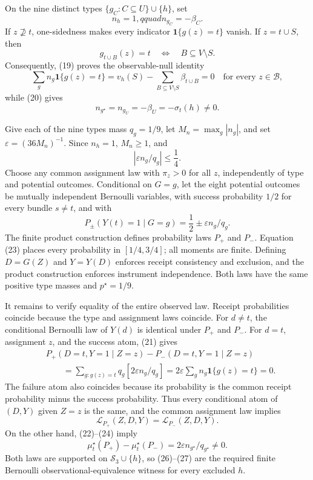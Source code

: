 On the nine distinct types \(\{g_C:C\subseteq U\}\cup\{h\}\), set
\[
n_h=1,qquad n_{g_C}=-\beta_C.
\]
If \(z\not\supseteq t\), one-sidedness makes every indicator \(\mathbf 1\{g(z)=t\}\) vanish.  If \(z=t\cup S\), then
\[
g_{t\cup B}(z)=t
\quad\Longleftrightarrow\quad B\subseteq V\setminus S.
\]
Consequently, (19) proves the observable-null identity
\[
\sum_g n_g\mathbf 1\{g(z)=t\}
=v_h(S)-\sum_{B\subseteq V\setminus S}\beta_{t\cup B}=0
\quad\text{for every }z\in\mathcal B, \tag{21}
\]
while (20) gives
\[
n_{g^\star}=n_{g_U}=-\beta_U=-\sigma_t(h)\ne0. \tag{22}
\]

Give each of the nine types mass \(q_g=1/9\), let \(M_n=\max_g|n_g|\), and set \(\varepsilon=(36M_n)^{-1}\).  Since \(n_h=1\), \(M_n\ge1\), and
\[
\left|\varepsilon n_g/q_g\right|\le\frac14. \tag{23}
\]
Choose any common assignment law with \(\pi_z>0\) for all \(z\), independently of type and potential outcomes.  Conditional on \(G=g\), let the eight potential outcomes be mutually independent Bernoulli variables, with success probability \(1/2\) for every bundle \(s\ne t\), and with
\[
P_\pm(Y(t)=1\mid G=g)=\frac12\pm\varepsilon n_g/q_g. \tag{24}
\]
The finite product construction defines probability laws \(P_+\) and \(P_-\).  Equation (23) places every probability in \([1/4,3/4]\); all moments are finite.  Defining \(D=G(Z)\) and \(Y=Y(D)\) enforces receipt consistency and exclusion, and the product construction enforces instrument independence.  Both laws have the same positive type masses and \(p^\star=1/9\).

It remains to verify equality of the entire observed law.  Receipt probabilities coincide because the type and assignment laws coincide.  For \(d\ne t\), the conditional Bernoulli law of \(Y(d)\) is identical under \(P_+\) and \(P_-\).  For \(d=t\), assignment \(z\), and the success atom, (21) gives
\[
\begin{aligned}
&P_+(D=t,Y=1\mid Z=z)-P_-(D=t,Y=1\mid Z=z)\\
&\qquad=\sum_{g:g(z)=t}q_g
\left[2\varepsilon n_g/q_g\right]
=2\varepsilon\sum_g n_g\mathbf 1\{g(z)=t\}=0.
\end{aligned} \tag{25}
\]
The failure atom also coincides because its probability is the common receipt probability minus the success probability.  Thus every conditional atom of \((D,Y)\) given \(Z=z\) is the same, and the common assignment law implies
\[
\mathcal L_{P_+}(Z,D,Y)=\mathcal L_{P_-}(Z,D,Y). \tag{26}
\]
On the other hand, (22)--(24) imply
\[
\mu_t^\star(P_+)-\mu_t^\star(P_-)
=2\varepsilon n_{g^\star}/q_{g^\star}\ne0. \tag{27}
\]
Both laws are supported on \(\mathcal S_3\cup\{h\}\), so (26)--(27) are the required finite Bernoulli observational-equivalence witness for every excluded \(h\).

